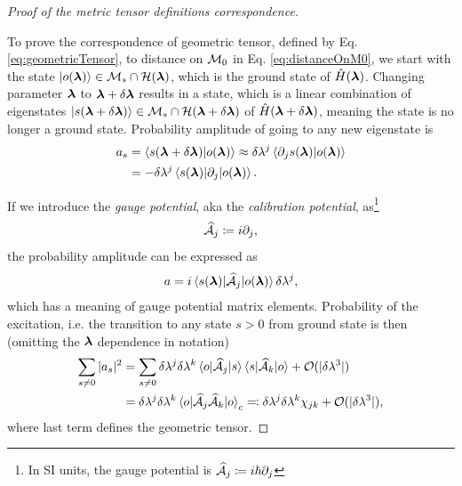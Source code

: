 \begin{proof}[Proof of the  metric tensor definitions correspondence]\
    \label{sec:derivationOfGeometricTensor}

    To prove the correspondence of geometric tensor, defined by Eq. \ref{eq:geometricTensor}, to distance on $\M_0$ in Eq. \ref{eq:distanceOnM0}, we start with the state $\ket{o(\llambda)}\in \M_s\cap\H(\llambda)$, which is the ground state of $\HH(\llambda)$. Changing parameter $\llambda$ to $\llambda+\delta \llambda$ results in a state, which is a linear combination of eigenstates $\ket{s(\llambda+\delta \llambda)}\in \M_s\cap\H(\llambda+\delta \llambda)$ of $\HH(\llambda+\delta \llambda)$, meaning the state is no longer a ground state. Probability amplitude of going to any new eigenstate is
    \begin{equation}
        \begin{split}
            a_s&=\braket{s(\llambda+\delta\llambda)|o(\llambda)}\approx \delta\lambda^j\braket{\partial_j s(\llambda)|o(\llambda)} \\
            &= -\delta\lambda^j\braket{s(\llambda)|\partial_j|o(\llambda)}.
        \end{split}
    \end{equation}

    If we introduce the \emph{gauge potential}, aka the \emph {calibration potential}, as\footnote{In SI units, the gauge potential is $\AA_j\coloneqq i\hbar\partial_{j}$}
    \begin{equation}
        \AA_j\coloneqq i\partial_{j},
    \end{equation}
    the probability amplitude can be expressed as
    \begin{equation}
    a=i\braket{s(\llambda)|\AA_j |o(\llambda)}\delta\lambda^j,
    \label{eq:probabilityOfTransitionIsGauge}
    \end{equation}
    which has a meaning of gauge potential matrix elements. Probability of the excitation, i.e. the transition to any state $s>0$ from ground state is then (omitting the $\llambda$ dependence in notation)
    \begin{equation}
        \begin{split}
            \sum_{s\neq 0}|a_s|^2&=  \sum_{s\neq 0} \delta \lambda^j \delta \lambda^k\braket{o|\AA_j|s}\braket{s|\AA_k|o}+\O(|\delta \lambda^3|) \\
            &= \delta \lambda^j \delta \lambda^k\braket{o|\AA_j \AA_k|o}_c\eqqcolon \delta \lambda^j \delta \lambda^k\chi_{jk}+\O(|\delta \lambda^3|),
        \end{split}
    \end{equation}
    where last term defines the geometric tensor.
\end{proof}







